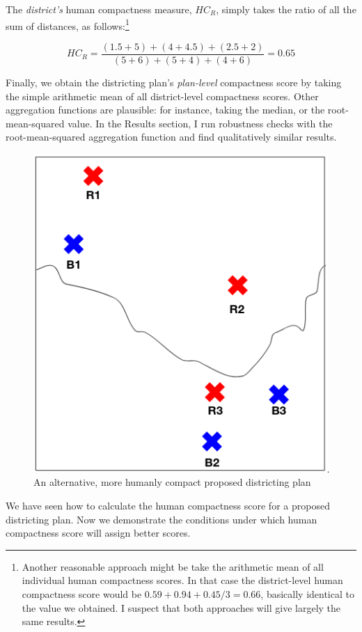 \documentclass[]{article}
\begin{document}
The \emph{district's} human compactness measure, \(HC_R\), simply takes
the ratio of all the sum of distances, as follows:\footnote{Another
  reasonable approach might be take the arithmetic mean of all
  individual human compactness scores. In that case the district-level
  human compactness score would be \(0.59 + 0.94 + 0.45 / 3 = 0.66\),
  basically identical to the value we obtained. I suspect that both
  approaches will give largely the same results.}

\[HC_R = \frac{(1.5+5) + (4 + 4.5) + (2.5 + 2)}{(5+6) + (5+4) + (4+6)} =
0.65\]

Finally, we obtain the districting plan's \emph{plan-level} compactness
score by taking the simple arithmetic mean of all district-level
compactness scores. Other aggregation functions are plausible: for
instance, taking the median, or the root-mean-squared value. In the
Results section, I run robustness checks with the root-mean-squared
aggregation function and find qualitatively similar results.

\begin{figure}
\centering
\includegraphics{img/human_compactness_3.png}
\caption{An alternative, more humanly compact proposed districting plan
\label{hc_better}}
\end{figure}

We have seen how to calculate the human compactness score for a proposed
districting plan. Now we demonstrate the conditions under which human
compactness score will assign better scores.
\end{document}

